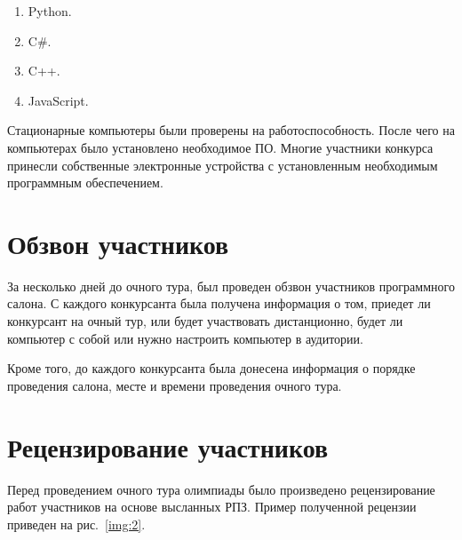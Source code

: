 \begin{enumerate}
	\item Python.
	\item C\#.
	\item C++.
	\item JavaScript.
\end{enumerate}

Стационарные компьютеры были проверены на работоспособность. После чего на компьютерах было установлено необходимое ПО. Многие участники конкурса принесли собственные электронные устройства с установленным необходимым программным обеспечением.

\section{Обзвон участников}

За несколько дней до очного тура, был проведен обзвон участников программного салона. С каждого конкурсанта была получена информация о том, приедет ли конкурсант на очный тур, или будет участвовать дистанционно, будет ли компьютер с собой или нужно настроить компьютер в аудитории. 

Кроме того, до каждого конкурсанта была донесена информация о порядке проведения салона, месте и времени проведения очного тура.

\section{Рецензирование участников}

Перед проведением очного тура олимпиады было произведено рецензирование работ участников на основе высланных РПЗ. Пример полученной рецензии приведен на рис.~\ref{img:2}.

\newpage

